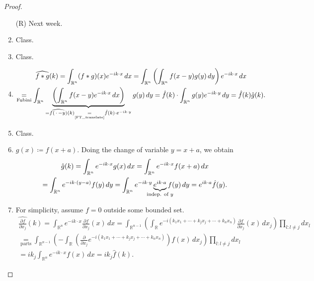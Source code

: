 \documentclass[12pt]{article}
\theoremstyle{definition}
\begin{document}
\begin{proof}
\begin{enumerate}[label=\arabic*)]
\item[(R)] Next week.

\item Class.

\item Class.

\item
\begin{multline*}
\widehat{f*g}(k)=\int_{\mathbb{R}^n}(f*g)(x)e^{-ik\cdot x}\,dx=\int_{\mathbb{R}^n}\left(\int_{\mathbb{R}^n}f(x-y)g(y)\,dy\right)e^{-ik\cdot x}\,dx\\
\underset{\text{Fubini}}{=}\int_{\mathbb{R}^n}\underbrace{\left(\int_{\mathbb{R}^n}f(x-y)e^{-ik\cdot x}\,dx\right)}_{=\widehat{f(\,\cdot\,-y)}(k)\underset{\text{\ref{FT_translate}}}{=}\hat{f}(k)\cdot e^{-ik\cdot y}}g(y)\,dy=\hat{f}(k)\cdot\int_{\mathbb{R}^n}g(y)e^{-ik\cdot y}\,dy=\hat{f}(k)\hat{g}(k).
\end{multline*}

\item Class.

\item $g(x)\coloneqq f(x+a)$. Doing the change of variable $y=x+a$, we obtain
\begin{multline*}
\hat{g}(k)=\int_{\mathbb{R}^n}e^{-ik\cdot x}g(x)\,dx=\int_{\mathbb{R}^n}e^{-ik\cdot x}f(x+a)\,dx\\
=\int_{\mathbb{R}^n}e^{-ik\cdot(y-a)}f(y)\,dy=\int_{\mathbb{R}^n}e^{-ik\cdot y}\underbrace{e^{ik\cdot a}}_{\mathclap{\text{indep. of }y}}f(y)\,dy=e^{ik\cdot a}\hat{f}(y).
\end{multline*}

\item For simplicity, assume $f=0$ outside some bounded set.
\begin{multline*}
\widehat{\frac{\partial f}{\partial x_j}}(k)=\int_{\mathbb{R}^n}e^{-ik\cdot x}\frac{\partial f}{\partial x_j}(x)\,dx=\int_{\mathbb{R}^{n-1}}\left(\int_{\mathbb{R}}e^{-i(k_1x_1+\cdots+k_jx_j+\cdots+k_nx_n)}\frac{\partial f}{\partial x_j}(x)\,dx_j\right)\prod_{l:l\neq j}dx_l\\
\underset{\text{parts}}{=}\int_{\mathbb{R}^{n-1}}\left(-\int_{\mathbb{R}}\left(\frac{\partial}{\partial x_j}e^{-i(k_1x_1+\cdots+k_jx_j+\cdots+k_nx_n)}\right)f(x)\,dx_j\right)\prod_{l:l\neq j}dx_l\\
=ik_j\int_{\mathbb{R}^n}e^{-ik\cdot x}f(x)\,dx=ik_j\hat{f}(k).
\end{multline*}
\end{enumerate}
\end{proof}
\end{document}
